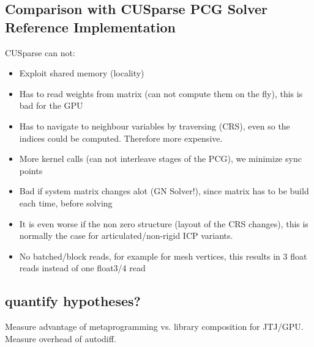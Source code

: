 \subsection{Comparison with CUSparse PCG Solver Reference Implementation}

CUSparse can not:
\begin{itemize}
\item Exploit shared memory (locality)
\item Has to read weights from matrix (can not compute them on the fly), this is bad for the GPU
\item Has to navigate to neighbour variables by traversing (CRS), even so the indices could be computed. Therefore more expensive.
\item More kernel calls (can not interleave stages of the PCG), we minimize sync points
\item Bad if system matrix changes alot (GN Solver!), since matrix has to be build each time, before solving
\item It is even worse if the non zero structure (layout of the CRS changes), this is normally the case for articulated/non-rigid ICP variants.
\item No batched/block reads, for example for mesh vertices, this results in 3 float reads instead of one float3/4 read
\end{itemize}

\subsection{quantify hypotheses?}
Measure advantage of metaprogramming vs. library composition for JTJ/GPU.
Measure overhead of autodiff.